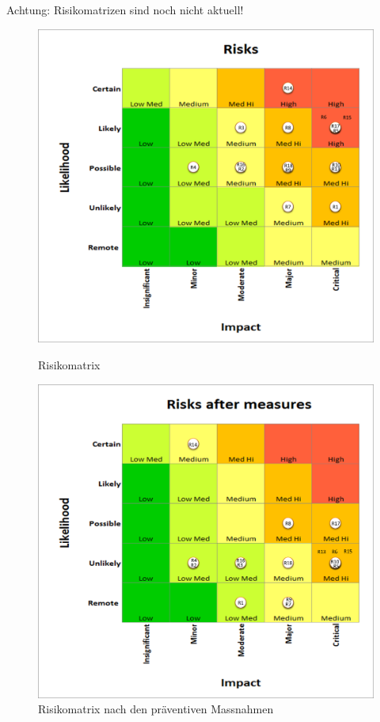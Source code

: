 Achtung: Risikomatrizen sind noch nicht aktuell!
\begin{figure}[H]
  \centering
  \begin{minipage}[t]{0.45\linewidth}
  \includegraphics[width=1.0\textwidth]{img/risikomanagement/Risks.png}
  \caption{Risikomatrix}
  \label{fig:risk-matrix}
  \end{minipage} 
  \hfill
  \begin{minipage}[t]{0.45\linewidth}
  \includegraphics[width=1.0\textwidth]{img/risikomanagement/RisksAfterMeasures.png}
  \caption{Risikomatrix nach den präventiven Massnahmen}
  \label{fig:risk-matrix-after-measures}
  \end{minipage}
\end{figure}

